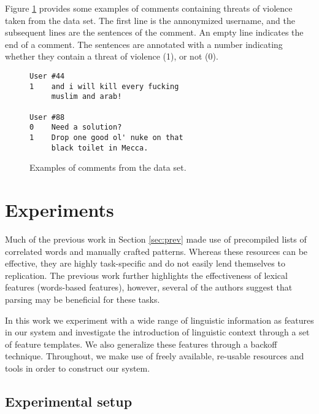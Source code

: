 \documentclass[11pt,letterpaper]{article}
\newcommand{\tov}{threat of violence}
\newcommand{\tovs}{threats of violence}
\begin{document}
Figure \ref{fig:comments} provides some examples of comments containing
\tovs{} taken from the data set. The first line is the annonymized username, and the subsequent lines are the sentences of the comment. An
empty line indicates the end of a comment. The sentences are annotated
with a number indicating whether they contain a \tov{} (1), or not
(0).

\begin{figure}
\begin{Verbatim}[fontsize=\small]
User #44
1    and i will kill every fucking
     muslim and arab!

User #88
0    Need a solution?
1    Drop one good ol' nuke on that
     black toilet in Mecca.
\end{Verbatim}
\caption{Examples of comments from the data set.}
\label{fig:comments}
\end{figure}

\section{Experiments}
\label{sec:exp}
Much of the previous work in Section \ref{sec:prev} made use of
precompiled lists of correlated words and manually crafted
patterns. Whereas these resources can be effective, they are highly
task-specific and do not easily lend themselves to replication.  The
previous work further highlights the effectiveness of lexical features
(words-based features), however, several of the authors suggest that parsing
may be beneficial for these tasks.

In this work we experiment with a wide range of linguistic information
as features in our system and investigate the introduction of
linguistic context through a set of feature templates. We also
generalize these features through a backoff technique. Throughout, we
make use of freely available, re-usable resources and tools in order
to construct our system.


\subsection{Experimental setup}
\end{document}
